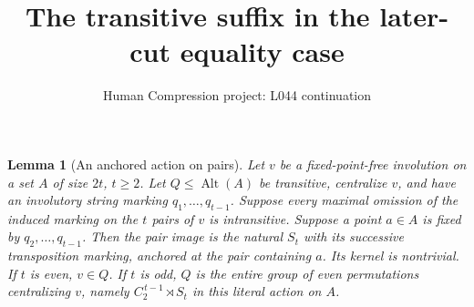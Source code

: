 \documentclass[11pt,a4paper]{article}
\title{The transitive suffix in the later-cut equality case}
\author{Human Compression project: L044 continuation}
\date{}
\newtheorem{lemma}{Lemma}
\begin{document}
\maketitle
\begin{lemma}[An anchored action on pairs]\label{pairs}
Let $v$ be a fixed-point-free involution on a set $A$ of size
$2t$, $t\ge2$. Let $Q\le\operatorname{Alt}(A)$ be transitive,
centralize $v$, and have an involutory string marking
$q_1,\ldots,q_{t-1}$. Suppose every maximal omission of the
induced marking on the $t$ pairs of $v$ is intransitive.
Suppose a point $a\in A$ is fixed by $q_2,\ldots,q_{t-1}$.
Then the pair image is the natural $S_t$ with its successive
transposition marking, anchored at the pair containing $a$.
Its kernel is nontrivial. If $t$ is even, $v\in Q$.
If $t$ is odd, $Q$ is the entire group of even permutations
centralizing $v$, namely $C_2^{\,t-1}\rtimes S_t$ in this
literal action on $A$.
\end{lemma}
\end{document}
